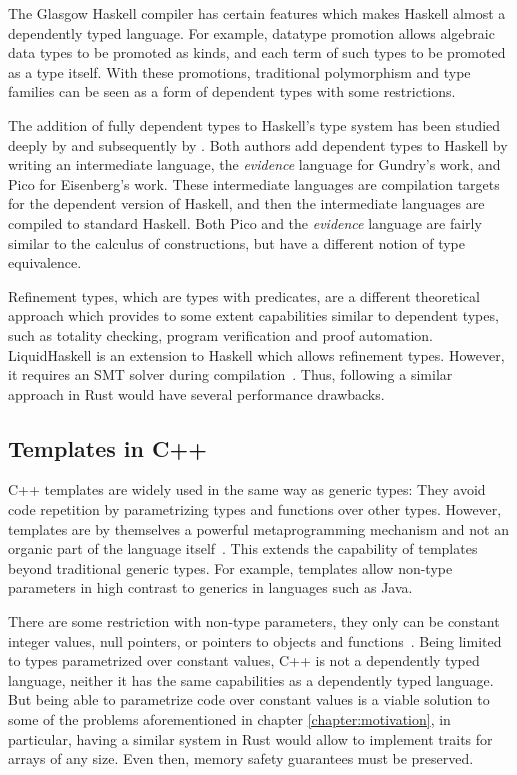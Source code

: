 The Glasgow Haskell compiler has certain features which makes Haskell almost a
dependently typed language. For example, datatype promotion allows algebraic
data types to be promoted as kinds, and each term of such types to be promoted
as a type itself. With these promotions, traditional polymorphism and type
families can be seen as a form of dependent types with some restrictions.

The addition of fully dependent types to Haskell's type system has been studied
deeply by \citet{gundry} and subsequently by \citet{eisenberg}. Both authors
add dependent types to Haskell by writing an intermediate language, the
\textit{evidence} language for Gundry's work, and Pico for Eisenberg's work.
These intermediate languages are compilation targets for the dependent version
of Haskell, and then the intermediate languages are compiled to standard
Haskell. Both Pico and the \textit{evidence} language are fairly similar to the
calculus of constructions, but have a different notion of type equivalence.

Refinement types, which are types with predicates, are a different theoretical
approach which provides to some extent capabilities similar to dependent types,
such as totality checking, program verification and proof automation.
LiquidHaskell is an extension to Haskell which allows refinement types. However,
it requires an SMT solver during compilation~\cite{liquidhaskell}. Thus,
following a similar approach in Rust would have several performance drawbacks.

\subsection{Templates in C++} 

C++ templates are widely used in the same way as generic types: They avoid code
repetition by parametrizing types and functions over other types. However,
templates are by themselves a powerful metaprogramming mechanism and not an
organic part of the language itself~\cite{template_metaprogramming}. This
extends the capability of templates beyond traditional generic types. For
example, templates allow non-type parameters in high contrast to generics in
languages such as Java.

There are some restriction with non-type parameters, they only can be constant
integer values, null pointers, or pointers to objects and
functions~\cite{templates}. Being limited to types parametrized over constant
values, C++ is not a dependently typed language, neither it has the same
capabilities as a dependently typed language. But being able to parametrize code
over constant values is a viable solution to some of the problems aforementioned
in chapter \ref{chapter:motivation}, in particular, having a similar system in
Rust would allow to implement traits for arrays of any size. Even then, memory
safety guarantees must be preserved.

